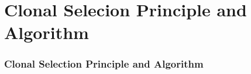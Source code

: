 \section{Clonal Selecion Principle and Algorithm}
\frame
{
\frametitle{Clonal Selection Principle and Algorithm}
}
